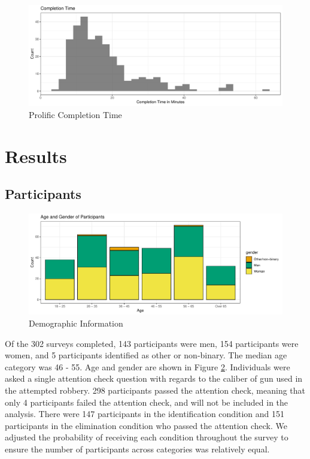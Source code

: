 \documentclass[print]{nuthesis}
\begin{document}
\begin{figure}

{\centering \includegraphics[width=\linewidth]{thesis_files/figure-latex/completiontime2-1} 

}

\caption{Prolific Completion Time}\label{fig:completiontime2}
\end{figure}

\hypertarget{results-1}{%
\section{Results}\label{results-1}}

\hypertarget{participants-1}{%
\subsection{Participants}\label{participants-1}}

\begin{figure}

{\centering \includegraphics[width=\linewidth]{thesis_files/figure-latex/demographics2-1} 

}

\caption{Demographic Information}\label{fig:demographics2}
\end{figure}

Of the 302 surveys completed, 143 participants were men, 154 participants were women, and 5 participants identified as other or non-binary.
The median age category was 46 - 55.
Age and gender are shown in Figure \ref{fig:demographics2}.
Individuals were asked a single attention check question with regards to the caliber of gun used in the attempted robbery.
298 participants passed the attention check, meaning that only 4 participants failed the attention check, and will not be included in the analysis.
There were 147 participants in the identification condition and 151 participants in the elimination condition who passed the attention check.
We adjusted the probability of receiving each condition throughout the survey to ensure the number of participants across categories was relatively equal.
\end{document}
